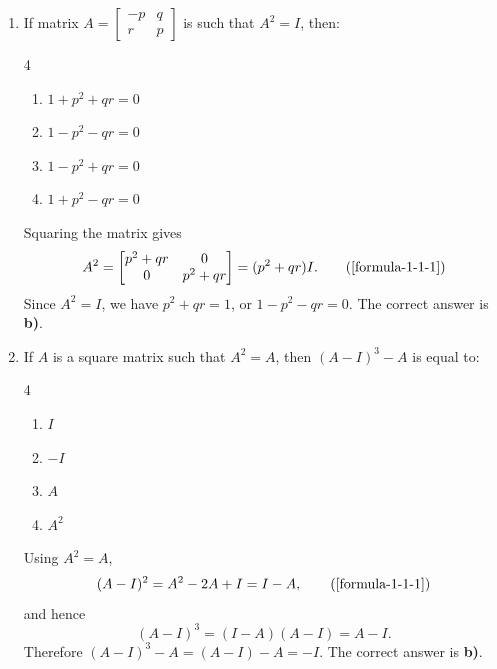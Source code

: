 \begin{enumerate}[label={},font=\normalfont,leftmargin=1.15cm,labelwidth=1.0cm,labelsep=0.15cm,itemindent=0pt,listparindent=0pt,itemsep=\baselineskip,parsep=0pt,topsep=0pt]
\item[5.1.1] If matrix $A=\begin{bmatrix}-p&q\\r&p\end{bmatrix}$ is such that $A^2=I$, then:

\begin{multicols}{4}
\begin{enumerate}
\setlength{\itemsep}{0pt}
    \item $1+p^2+qr=0$
    \item $1-p^2-qr=0$
    \item $1-p^2+qr=0$
    \item $1+p^2-qr=0$
\end{enumerate}
\end{multicols}

\vspace{0.6em}\par\solution


Squaring the matrix gives
\begin{equation*}
A^2=\begin{bmatrix}p^2+qr&0\\0&p^2+qr\end{bmatrix}=(p^2+qr)I.
\tag*{(\ref{formula-1-1-1})}\end{equation*}
Since $A^2=I$, we have $p^2+qr=1$, or $1-p^2-qr=0$. The correct answer is \textbf{b)}.

\item[5.1.2] If $A$ is a square matrix such that $A^2=A$, then $(A-I)^3-A$ is equal to:

\begin{multicols}{4}
\begin{enumerate}
\setlength{\itemsep}{0pt}
    \item $I$
    \item $-I$
    \item $A$
    \item $A^2$
\end{enumerate}
\end{multicols}

\vspace{0.6em}\par\solution


Using $A^2=A$,
\begin{equation*}
(A-I)^2=A^2-2A+I=I-A,
\tag*{(\ref{formula-1-1-1})}\end{equation*}
and hence
\[
(A-I)^3=(I-A)(A-I)=A-I.
\]
Therefore $(A-I)^3-A=(A-I)-A=-I$. The correct answer is \textbf{b)}.


\end{enumerate}
